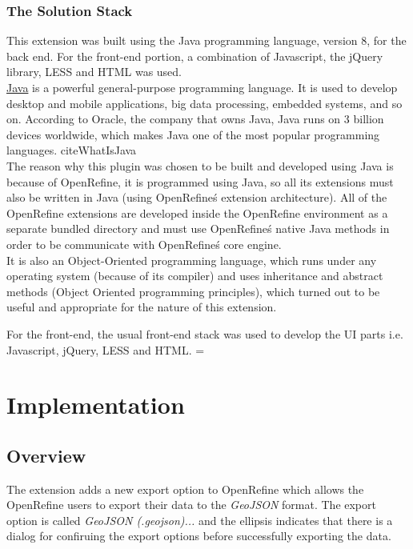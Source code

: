 \subsubsection{The Solution Stack}
This extension was built using the Java programming language, version 8, for the back end. For the front-end portion,
a combination of Javascript, the jQuery library, LESS and HTML was used. \\
\newline
\href{https://www.java.com/en/}{Java} is a powerful general-purpose programming language.
It is used to develop desktop and mobile applications,
big data processing, embedded systems, and so on.
According to Oracle, the company that owns Java, Java runs on 3 billion devices worldwide, which makes Java one of the most popular programming languages. cite{WhatIsJava}\\
\newline
The reason why this plugin was chosen to be built and developed using Java is
because of OpenRefine, it is programmed using Java,
so all its extensions must also be written in Java (using OpenRefine\'s extension
architecture). All of the OpenRefine extensions are developed inside the
OpenRefine environment as a separate bundled directory and must use OpenRefine\'s
native Java methods in order to be communicate with OpenRefine\'s core engine.\\
It is also an Object-Oriented programming language, which runs under any operating system
(because of its compiler) and uses inheritance and abstract methods (Object Oriented programming principles),
which turned out to be useful and appropriate for the nature of this extension.\\
\newline

For the front-end, the usual front-end stack was used to develop the UI parts i.e. Javascript, jQuery, LESS and HTML.
\pagebreak=
\section{Implementation}
\subsection{Overview}
The extension adds a new export option to OpenRefine which allows the OpenRefine users to
export their data to the \textit{GeoJSON} format. The export option is called \textit{GeoJSON (.geojson)...} and the ellipsis
indicates that there is a dialog for confiruing the export options before successfully exporting the data.
